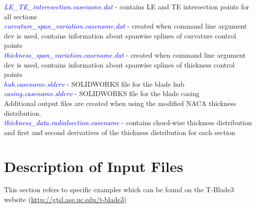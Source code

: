 \documentclass[8pt]{article}
\begin{document}
\textit{\textcolor{blue}{LE\_TE\_interesection.casename.dat}} - contains LE and TE intersection points for all sections\\
\textit{\textcolor{blue}{curvature\_span\_variation.casename.dat}} - created when command line argument {\selectfont dev} is used, contains information about spanwise splines of curvature control points\\
\textit{\textcolor{blue}{thickness\_span\_variation.casename.dat}} - created when command line argument {\selectfont dev} is used, contains information about spanwise splines of thickness control points\\
\textit{\textcolor{blue}{hub.casename.sldcrv}} - SOLIDWORKS file for the blade hub\\
\textit{\textcolor{blue}{casing.casename.sldcrv}} - SOLIDWORKS file for the blade casing\\

\noindent
Additional output files are created when using the modified NACA thickness distribution.\\
\noindent
\textit{\textcolor{blue}{thickness\_data.radialsection.casename}} - contains chord-wise thickness distribution and first and second derivatives of the thickness distribution for each section

\section{Description of Input Files}
\noindent
This section refers to specific examples which can be found on the T-Blade3 website (\url{http://gtsl.ase.uc.edu/t-blade3})
\end{document}
